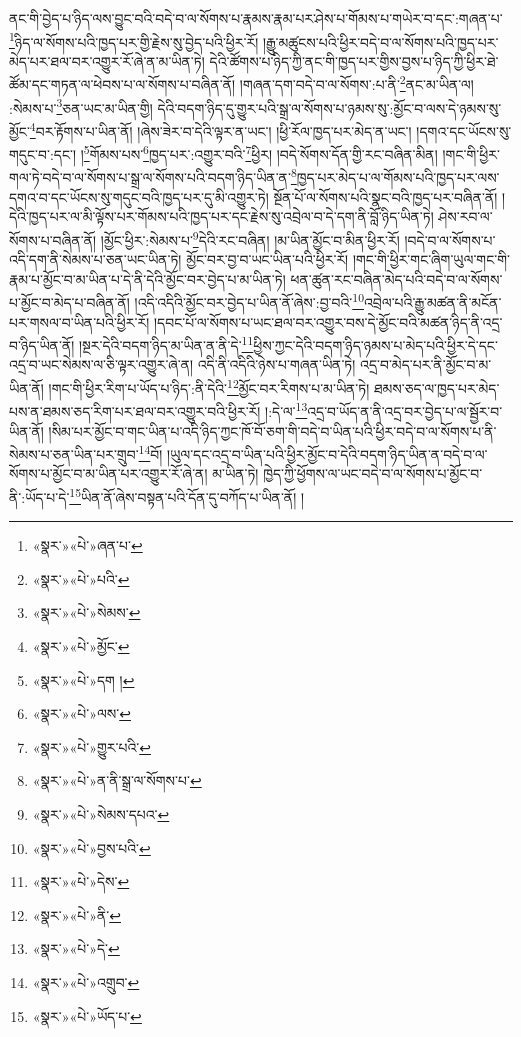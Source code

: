 ནང་གི་བྱེད་པ་ཉིད་ལས་བྱུང་བའི་བདེ་བ་ལ་སོགས་པ་རྣམས་རྣམ་པར་ཤེས་པ་གོམས་པ་གཡེར་བ་དང་:གཞན་པ་\footnote{«སྣར་»«པེ་»ཞན་པ་}ཉིད་ལ་སོགས་པའི་ཁྱད་པར་གྱི་རྗེས་སུ་བྱེད་པའི་ཕྱིར་རོ། །རྒྱུ་མཚུངས་པའི་ཕྱིར་བདེ་བ་ལ་སོགས་པའི་ཁྱད་པར་མེད་པར་ཐལ་བར་འགྱུར་རོ་ཞེ་ན་མ་ཡིན་ཏེ། དེའི་ཚོགས་པ་ཉིད་ཀྱི་ནང་གི་ཁྱད་པར་གྱིས་བྱས་པ་ཉིད་ཀྱི་ཕྱིར་ཐེ་ཚོམ་དང་གཏན་ལ་ཕེབས་པ་ལ་སོགས་པ་བཞིན་ནོ། །གཞན་དག་བདེ་བ་ལ་སོགས་:པ་ནི་\footnote{«སྣར་»«པེ་»པའི་}ནང་མ་ཡིན་ལ། :སེམས་པ་\footnote{«སྣར་»«པེ་»སེམས་}ཅན་ཡང་མ་ཡིན་གྱི། དེའི་བདག་ཉིད་དུ་གྱུར་པའི་སྒྲ་ལ་སོགས་པ་ཉམས་སུ་:མྱོང་བ་ལས་དེ་ཉམས་སུ་མྱོང་\footnote{«སྣར་»«པེ་»མྱོང་}བར་རྟོགས་པ་ཡིན་ནོ། །ཞེས་ཟེར་བ་དེའི་ལྟར་ན་ཡང་། །ཕྱི་རོལ་ཁྱད་པར་མེད་ན་ཡང་། །དགའ་དང་ཡོངས་སུ་གདུང་བ་:དང་། །\footnote{«སྣར་»«པེ་»དག །}གོམས་པས་\footnote{«སྣར་»«པེ་»ལས་}ཁྱད་པར་:འགྱུར་བའི་\footnote{«སྣར་»«པེ་»གྱུར་པའི་}ཕྱིར། །བདེ་སོགས་དོན་གྱི་རང་བཞིན་མིན། །གང་གི་ཕྱིར་གལ་ཏེ་བདེ་བ་ལ་སོགས་པ་སྒྲ་ལ་སོགས་པའི་བདག་ཉིད་ཡིན་ན་\footnote{«སྣར་»«པེ་»ན་ནི་སྒྲ་ལ་སོགས་པ་}ཁྱད་པར་མེད་པ་ལ་གོམས་པའི་ཁྱད་པར་ལས་དགའ་བ་དང་ཡོངས་སུ་གདུང་བའི་ཁྱད་པར་དུ་མི་འགྱུར་ཏེ། སྔོན་པོ་ལ་སོགས་པའི་སྣང་བའི་ཁྱད་པར་བཞིན་ནོ། །དེའི་ཁྱད་པར་ལ་མི་ལྟོས་པར་གོམས་པའི་ཁྱད་པར་དང་རྗེས་སུ་འབྲེལ་བ་དེ་དག་ནི་བློ་ཉིད་ཡིན་ཏེ། ཤེས་རབ་ལ་སོགས་པ་བཞིན་ནོ། །མྱོང་ཕྱིར་:སེམས་པ་\footnote{«སྣར་»«པེ་»སེམས་དཔའ་}དེའི་རང་བཞིན། །མ་ཡིན་མྱོང་བ་མིན་ཕྱིར་རོ། །བདེ་བ་ལ་སོགས་པ་འདི་དག་ནི་སེམས་པ་ཅན་ཡང་ཡིན་ཏེ། མྱོང་བར་བྱ་བ་ཡང་ཡིན་པའི་ཕྱིར་རོ། །གང་གི་ཕྱིར་གང་ཞིག་ཡུལ་གང་གི་རྣམ་པ་མྱོང་བ་མ་ཡིན་པ་དེ་ནི་དེའི་མྱོང་བར་བྱེད་པ་མ་ཡིན་ཏེ། ཕན་ཚུན་རང་བཞིན་མེད་པའི་བདེ་བ་ལ་སོགས་པ་མྱོང་བ་མེད་པ་བཞིན་ནོ། །འདི་འདིའི་མྱོང་བར་བྱེད་པ་ཡིན་ནོ་ཞེས་:བྱ་བའི་\footnote{«སྣར་»«པེ་»བྱས་པའི་}འབྲེལ་པའི་རྒྱུ་མཚན་ནི་མངོན་པར་གསལ་བ་ཡིན་པའི་ཕྱིར་རོ། །དབང་པོ་ལ་སོགས་པ་ཡང་ཐལ་བར་འགྱུར་བས་དེ་མྱོང་བའི་མཚན་ཉིད་ནི་འདྲ་བ་ཉིད་ཡིན་ནོ། །སྔར་དེའི་བདག་ཉིད་མ་ཡིན་ན་ནི་དེ་\footnote{«སྣར་»«པེ་»དེས་}ཕྱིས་ཀྱང་དེའི་བདག་ཉིད་ཉམས་པ་མེད་པའི་ཕྱིར་དེ་དང་འདྲ་བ་ཡང་སེམས་ལ་ཅི་ལྟར་འགྱུར་ཞེ་ན། འདི་ནི་འདིའི་ཉེས་པ་གཞན་ཡིན་ཏེ། འདྲ་བ་མེད་པར་ནི་མྱོང་བ་མ་ཡིན་ནོ། །གང་གི་ཕྱིར་རིག་པ་ཡོད་པ་ཉིད་:ནི་དེའི་\footnote{«སྣར་»«པེ་»ནི་}མྱོང་བར་རིགས་པ་མ་ཡིན་ཏེ། ཐམས་ཅད་ལ་ཁྱད་པར་མེད་པས་ན་ཐམས་ཅད་རིག་པར་ཐལ་བར་འགྱུར་བའི་ཕྱིར་རོ། །:དེ་ལ་\footnote{«སྣར་»«པེ་»དེ་}འདྲ་བ་ཡོད་ན་ནི་འདྲ་བར་བྱེད་པ་ལ་སྦྱོར་བ་ཡིན་ནོ། །སིམ་པར་མྱོང་བ་གང་ཡིན་པ་འདི་ཉིད་ཀྱང་ཁོ་བོ་ཅག་གི་བདེ་བ་ཡིན་པའི་ཕྱིར་བདེ་བ་ལ་སོགས་པ་ནི་སེམས་པ་ཅན་ཡིན་པར་གྲུབ་\footnote{«སྣར་»«པེ་»འགྲུབ་}བོ། །ཡུལ་དང་འདྲ་བ་ཡིན་པའི་ཕྱིར་མྱོང་བ་དེའི་བདག་ཉིད་ཡིན་ན་བདེ་བ་ལ་སོགས་པ་མྱོང་བ་མ་ཡིན་པར་འགྱུར་རོ་ཞེ་ན། མ་ཡིན་ཏེ། ཁྱེད་ཀྱི་ཕྱོགས་ལ་ཡང་བདེ་བ་ལ་སོགས་པ་མྱོང་བ་ནི་:ཡོད་པ་དེ་\footnote{«སྣར་»«པེ་»ཡོད་པ་}ཡིན་ནོ་ཞེས་བསྟན་པའི་དོན་དུ་བཀོད་པ་ཡིན་ནོ། །
